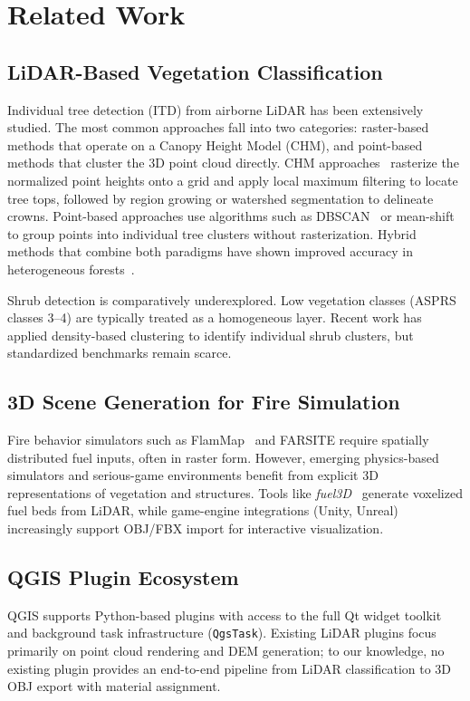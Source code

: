 \section{Related Work}
\label{sec:relatedwork}

\subsection{LiDAR-Based Vegetation Classification}

Individual tree detection (ITD) from airborne LiDAR has been extensively studied. The most common approaches fall into two categories: raster-based methods that operate on a Canopy Height Model (CHM), and point-based methods that cluster the 3D point cloud directly. CHM approaches~\cite{popescu2004} rasterize the normalized point heights onto a grid and apply local maximum filtering to locate tree tops, followed by region growing or watershed segmentation to delineate crowns. Point-based approaches use algorithms such as DBSCAN~\cite{ester1996dbscan} or mean-shift to group points into individual tree clusters without rasterization. Hybrid methods that combine both paradigms have shown improved accuracy in heterogeneous forests~\cite{zhen2016}.

Shrub detection is comparatively underexplored. Low vegetation classes (ASPRS classes 3--4) are typically treated as a homogeneous layer. Recent work has applied density-based clustering to identify individual shrub clusters, but standardized benchmarks remain scarce.

\subsection{3D Scene Generation for Fire Simulation}

Fire behavior simulators such as FlamMap~\cite{finney2006} and FARSITE require spatially distributed fuel inputs, often in raster form. However, emerging physics-based simulators and serious-game environments benefit from explicit 3D representations of vegetation and structures. Tools like \textit{fuel3D}~\cite{parsons2011} generate voxelized fuel beds from LiDAR, while game-engine integrations (Unity, Unreal) increasingly support OBJ/FBX import for interactive visualization.

\subsection{QGIS Plugin Ecosystem}

QGIS supports Python-based plugins with access to the full Qt widget toolkit and background task infrastructure (\texttt{QgsTask}). Existing LiDAR plugins focus primarily on point cloud rendering and DEM generation; to our knowledge, no existing plugin provides an end-to-end pipeline from LiDAR classification to 3D OBJ export with material assignment.
